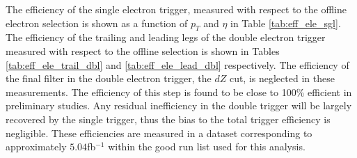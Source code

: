 
The efficiency of the single electron trigger, measured 
with respect to the offline electron selection is shown 
as a function of $p_T$ and $\eta$ in Table \ref{tab:eff_ele_sgl}.
The efficiency of the trailing and leading legs of the double electron trigger
measured with respect to the offline selection is shown
in Tables \ref{tab:eff_ele_trail_dbl} and \ref{tab:eff_ele_lead_dbl} respectively.
The efficiency of the final filter in the double electron trigger, the $dZ$ cut,
is neglected in these measurements.  The efficiency of this step is found to be
close to 100\% efficient in preliminary studies.  Any residual inefficiency
in the double trigger will be largely recovered by the single trigger,
thus the bias to the total trigger efficiency is negligible.
These efficiencies are measured in a dataset corresponding
to approximately $5.04$fb$^{-1}$ within the good run list used for this analysis.

